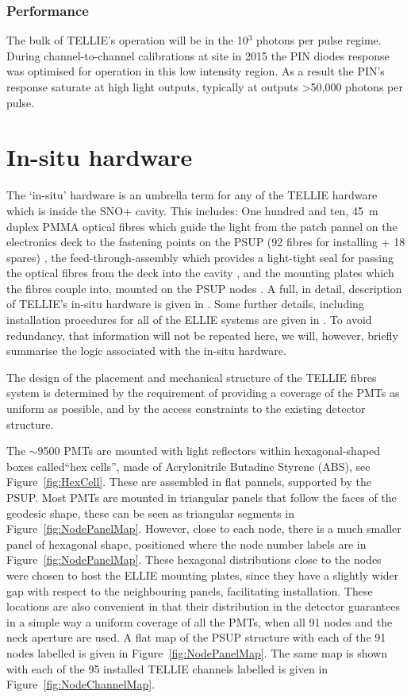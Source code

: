 \documentclass[12pt]{report}
\begin{document}
\subsection{Performance}
The bulk of TELLIE's operation will be in the 10$^3$ photons per pulse regime. During channel-to-channel calibrations at site in 2015 the PIN diodes response was optimised for operation in this low intensity region. As a result the PIN's response saturate at high light outputs, typically at outputs \textgreater 50,000 photons per pulse. 

\chapter{In-situ hardware}
\label{chap:inSitu}
The `in-situ' hardware is an umbrella term for any of the TELLIE hardware which is inside the SNO+ cavity. This includes: One hundred and ten, 45~m duplex PMMA optical fibres which guide the light from the patch pannel on the electronics deck to the fastening points on the PSUP (92 fibres for installing + 18 spares) \cite{tellieFibreHardware}, the feed-through-assembly which provides a light-tight seal for passing the optical fibres from the deck into the cavity \cite{feedThroughDrawings}, and the mounting plates which the fibres couple into, mounted on the PSUP nodes \cite{telliePlatesDrawings} \cite{amelliePlatesDrawings}. A full, in detail, description of TELLIE's in-situ hardware is given in \cite{tellieFibreHardware}. Some further details, including installation procedures for all of the ELLIE systems are given in \cite{ellieInstall}. To avoid redundancy, that information will not be repeated here, we will, however, briefly summarise the logic associated with the in-situ hardware. 

The design of the placement and mechanical structure of the TELLIE fibres system is determined by the requirement of providing a coverage of the PMTs as uniform as possible, and by the access constraints to the existing detector structure. 

The $\sim$9500 PMTs are mounted with light reflectors within hexagonal-shaped boxes called``hex cells'', made of Acrylonitrile Butadine Styrene (ABS), see Figure~\ref{fig:HexCell}. These are assembled in flat pannels, supported by the PSUP. Most PMTs are mounted in triangular panels that follow the faces of the geodesic shape, these can be seen as triangular segments in Figure~\ref{fig:NodePanelMap}. However, close to each node, there is a much smaller panel of hexagonal shape, positioned where the node number labels are in Figure~\ref{fig:NodePanelMap}. These hexagonal distributions close to the nodes were chosen to host the ELLIE mounting plates, since they have a slightly wider gap with respect to the neighbouring panels, facilitating installation. These locations are also convenient in that their distribution in the detector guarantees in a simple way a uniform coverage of all the PMTs, when all 91 nodes and the neck aperture are used. A flat map of the PSUP structure with each of the 91 nodes labelled is given in Figure~\ref{fig:NodePanelMap}. The same map is shown with each of the 95 installed TELLIE channels labelled is given in Figure~\ref{fig:NodeChannelMap}.
\end{document}
